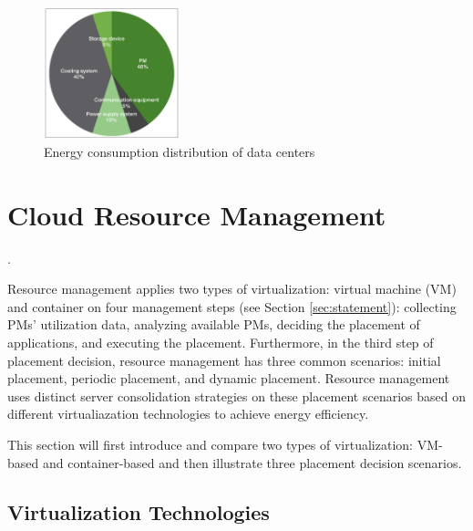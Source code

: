 
\begin{figure}
	\centering
		\includegraphics[width=0.35\textwidth]{pics/energyConsumption.png}
		\caption{Energy consumption distribution of data centers \cite{Rong:2016js}}
		\label{fig:consumption}

\end{figure} 

\section{Cloud Resource Management}
\label{sec:resource_management}
 \cite{Jennings:2015ht}.

Resource management applies two types of virtualization: virtual machine (VM) and container on four management steps (see Section \ref{sec:statement}): collecting PMs' utilization data, analyzing available PMs, deciding the placement of applications, and executing the placement. Furthermore, in the third step of placement decision, resource management has three common scenarios: initial placement, periodic placement, and dynamic placement. Resource management uses distinct server consolidation strategies on these placement scenarios based on different virtualiazation technologies to achieve energy efficiency. 

This section will first introduce and compare two types of virtualization: VM-based and container-based and then illustrate 
three placement decision scenarios. 

\subsection{Virtualization Technologies}
\label{sec:virtualization}

